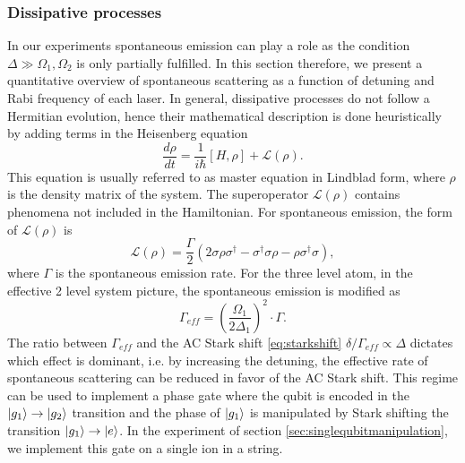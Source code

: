 \subsubsection{Dissipative processes}
\label{sec:dissipation}
In our experiments spontaneous emission can play a role as the condition $\Delta \gg \Omega_1,\Omega_2$ is only partially fulfilled. In this section therefore, we present a quantitative overview of spontaneous scattering as a function of detuning and Rabi frequency of each laser. In general, dissipative processes do not follow a Hermitian evolution, hence their mathematical description is done heuristically by adding terms in the Heisenberg equation
\begin{equation}
\label{masterequation}
\frac{d\rho}{dt} = \frac{1}{i\hbar}[H,\rho] + \mathcal{L}(\rho).
\end{equation}
This equation is usually referred to as master equation in Lindblad form, where $\rho$ is the density matrix of the system. The superoperator
$\mathcal{L}(\rho)$ contains phenomena not included in the Hamiltonian. For spontaneous emission, the form of $\mathcal{L}(\rho)$ is \cite{quantumnoise}
\begin{equation}
\mathcal{L}(\rho) = \frac{\Gamma}{2}(2\sigma \rho \sigma^\dagger -\sigma^\dagger\sigma \rho - \rho \sigma^\dagger \sigma),
\end{equation}
where $\Gamma$ is the spontaneous emission rate.
For the three level atom, in the effective 2 level system picture, the spontaneous emission is modified as \cite{russo}
\begin{equation}
\label{eq:gammaeff}
\Gamma_{eff} = \left(\frac{\Omega_1}{2 \Delta_1}\right)^2 \cdot \Gamma.
\end{equation}
The ratio between $\Gamma_{eff}$ and the AC Stark shift \eqref{eq:starkshift} $\delta/\Gamma_{eff}\propto \Delta$ dictates which effect is dominant, i.e. by increasing the detuning, the effective rate of spontaneous scattering can be reduced in favor of the AC Stark shift. This regime can be used to implement a phase gate where the qubit is encoded in the $\ket{g_1}\to\ket{g_2}$ transition and the phase of $\ket{g_1}$ is manipulated by Stark shifting the transition $\ket{g_1}\to \ket{e}$. In the experiment of section \ref{sec:singlequbitmanipulation}, we implement this gate on a single ion in a string.


